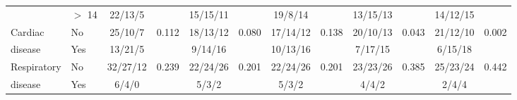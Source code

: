 \begin{sidewaystable}[p]
\begin{tabular}{|l l| c c | c c| c c | c c |c c |}
		                    & $>$ 14    & 22/13/5         &             & 15/15/11     &                & 19/8/14      &                        & 13/15/13     &                   & 14/12/15     &  \\
		Cardiac             & No        & 25/10/7         & 0.112       & 18/13/12     & 0.080          & 17/14/12     & 0.138                  & 20/10/13     & 0.043             & 21/12/10     & 0.002                \\
		disease             & Yes       & 13/21/5         &             & 9/14/16      &                & 10/13/16     &                        & 7/17/15      &                   & 6/15/18      &  \\
		Respiratory         & No        & 32/27/12        & 0.239       & 22/24/26     & 0.201          & 22/24/26     & 0.201                  & 23/23/26     & 0.385             & 25/23/24     & 0.442                \\
		disease             & Yes       & 6/4/0           &             & 5/3/2        &                & 5/3/2        &                        & 4/4/2        &                   & 2/4/4        &
	\end{tabular}
\end{sidewaystable}

		